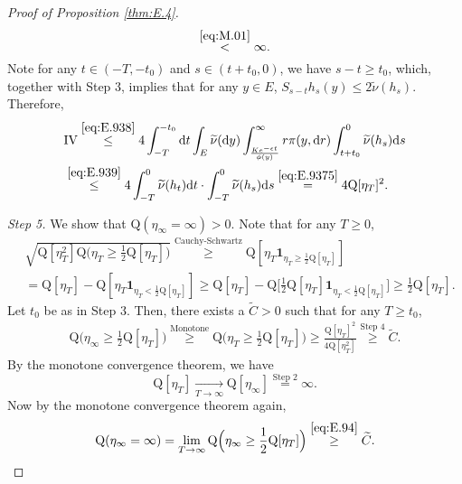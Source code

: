 \documentclass[12pt,a4paper]{amsart}
\numberwithin{equation}{section}
\theoremstyle{plain}
\theoremstyle{definition}
\theoremstyle{remark}
\begin{document}
\begin{proof}[Proof of Proposition \ref{thm:E.4}]
\begin{equation}
	\overset{\eqref{eq:M.01}}<\infty.
\end{equation}
	Note for any $t\in (-T,-t_0)$ and $s\in (t+t_0,0)$, we have $s-t\geq t_0$, 
	which, together with Step 3, 
	implies that for any $y\in E$, $S_{s-t}h_s(y) \leq 2 \widetilde\nu(h_s)$.
	Therefore,
\begin{align}
	&\text{IV}
	\overset{\eqref{eq:E.938}}\leq 4 \int_{-T}^{-t_0}\mathrm dt\int_E\widetilde \nu(\mathrm dy)\int_{\frac{Ke^{-\epsilon t}}{\phi(y)}}^\infty r \pi(y, \mathrm dr) \int_{t+t_0}^0 \widetilde \nu(h_s) \mathrm ds
	\\ &\overset{\eqref{eq:E.939}}\leq 4 \int_{-T}^0 \widetilde \nu(h_t)\mathrm dt \cdot \int_{-T}^0 \widetilde \nu(h_s)\mathrm ds
	\overset{\eqref{eq:E.9375}}= 4\mathrm Q[\eta_T]^2.
\end{align}

\emph{Step 5.}
	We show that $\mathrm Q(\eta_{\infty}=\infty) >0$.
	Note that for any $T\geq 0$,
\begin{align}
	&\sqrt{\mathrm Q[\eta_T^2] \mathrm Q\Big(\eta_T \geq \frac{1}{2}\mathrm Q[\eta_T]\Big)}
	\overset{\text{Cauchy-Schwartz}}\geq \mathrm Q[\eta_T\mathbf 1_{\eta_T\geq \frac{1}{2}\mathrm Q[\eta_T]}]
	\\&= \mathrm Q[\eta_T] - \mathrm Q[\eta_T\mathbf 1_{\eta_T< \frac{1}{2}\mathrm Q[\eta_T]} ]
	\geq \mathrm Q[\eta_T] - \mathrm Q\Big[\frac{1}{2}\mathrm Q[\eta_T]\mathbf 1_{\eta_T< \frac{1}{2}\mathrm Q[\eta_T]}\Big]
	\geq \frac{1}{2}\mathrm Q[\eta_T].
\end{align}
	Let $t_0$ be as in Step 3.
	Then, there exists a $\widetilde C>0$ such that for any $T\geq t_0$,
\begin{align}\label{eq:E.94}
	\mathrm Q\Big(\eta_\infty \geq \frac{1}{2}\mathrm Q[\eta_T]\Big)
	\overset{\text{Monotone}}\geq \mathrm Q\Big(\eta_T \geq \frac{1}{2}\mathrm Q[\eta_T]\Big)
	\geq \frac{\mathrm Q[\eta_T]^2}{4\mathrm Q[\eta_T^2]}
	\overset{\text{Step 4}}\geq \widetilde C.
\end{align}
	By the monotone convergence theorem, we have
\[
	\mathrm Q[\eta_T]
	\xrightarrow[T\to \infty]{} \mathrm Q[\eta_\infty]
	\overset{\text{Step 2}}= \infty.
\]
	Now by the monotone convergence theorem again,
\begin{align}
	\mathrm Q(\eta_\infty =\infty)
	= \lim_{T\to \infty} \mathrm Q\Big(\eta_\infty \geq \frac{1}{2}\mathrm Q[\eta_T]\Big)
	\overset{\eqref{eq:E.94}}\geq \widetilde C.
\end{align}
	

\end{proof}
\end{document}
